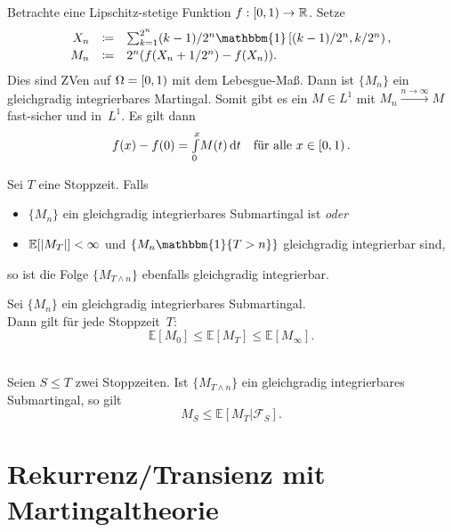 \documentclass{cheat-sheet}
\newcommand{\E}{\mathbb{E}} %
\newcommand{\ind}{\mathbbm{1}} %
\newcommand{\Filt}{\mathcal{F}} %
\begin{document}
\begin{bsp}
  Betrachte eine Lipschitz-stetige Funktion $f : \left[ 0, 1 \right) \to \mathbb{R}$.
  Setze
  \[
    \begin{array}{r c l}
      X_n &\coloneqq& {\sum}_{k=1}^{2^n} (k-1)/2^n \ind \cointerval{(k-1)/2^n}{k/2^n}, \\[0.2em]
      M_n &\coloneqq& 2^n (f(X_n + 1/2^n) - f(X_n)).
    \end{array}
  \]
  Dies sind ZVen auf $\Omega = \left[ 0, 1 \right)$ mit dem Lebesgue-Maß.
  Dann ist $\{ M_n \}$ ein gleichgradig integrierbares Martingal.
  Somit gibt es ein $M \in L^1$ mit $M_n \xrightarrow{n \to \infty} M$ fast-sicher und in~$L^1$.
  Es gilt dann
  \[
    f(x) - f(0) = {\textstyle \int\limits_{0}^{x}} M(t) \,\mathrm{d} t
    \quad \text{für alle } x \in \left[ 0, 1 \right).
  \]
\end{bsp}


\begin{satz}
  Sei $T$ eine Stoppzeit.
  Falls
  \begin{itemize}
    \item $\{ M_n \}$ ein gleichgradig integrierbares Submartingal ist \textit{oder}
    \item $\E[ \abs{M_T} ] < \infty$ und $\{ M_n \ind \{ T > n \} \}$ gleichgradig integrierbar sind,
  \end{itemize}
  so ist die Folge $\{ M_{T \wedge n} \}$ ebenfalls gleichgradig integrierbar.
\end{satz}

\begin{satz}
  Sei $\{ M_n \}$ ein gleichgradig integrierbares Submartingal. \\
  Dann gilt für jede Stoppzeit~$T$:
  \[ \E[M_0] \leq \E[M_T] \leq \E[M_\infty]. \]
\end{satz}

\begin{satz} \mbox{}\\
  Seien $S \leq T$ zwei Stoppzeiten.
  Ist $\{ M_{T \wedge n} \}$ ein gleichgradig integrierbares Submartingal, so gilt
  \[
    M_S \leq \E[ M_T | \Filt_S ].
  \]
\end{satz}

\section{Rekurrenz/Transienz mit Martingaltheorie}
\end{document}
